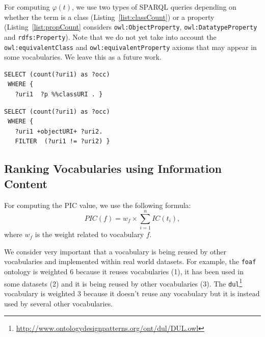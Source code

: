 For computing $\varphi(t)$, we use two types of SPARQL queries depending on whether the term is a class (Listing~\ref{list:classCount}) or a property (Listing~\ref{list:propCount} considers \texttt{owl:ObjectProperty}, \texttt{owl:Data\-typeProperty} and \texttt{rdfs:Property}). Note that we do not yet take into account the \texttt{owl:equivalentClass} and \texttt{owl:equi\-valentProperty} axioms that may appear in some vocabularies. We leave this as a future work.

\begin{lstlisting}[float=htb,caption={SPARQL query for computing the occurrence of a class },label=list:classCount]
 SELECT (count(?uri1) as ?occ)
 WHERE {
   ?uri1  ?p %%classURI . }
\end{lstlisting}

\begin{lstlisting}[float=htb,caption={SPARQL query for computing the occurrence of a property },label=list:propCount]
 SELECT (count(?uri1) as ?occ)
 WHERE {
   ?uri1 +objectURI+ ?uri2.
   FILTER  (?uri1 != ?uri2) }
\end{lstlisting}

\subsection{Ranking Vocabularies using Information Content}
For computing the PIC value, we use the following formula:
\begin{equation}
 PIC(f) =  w_{f} \times \sum_{i=1}^{n}IC(t_{i})  ,
\end{equation}
where $w_{f}$ is the weight related to vocabulary $f$.

We consider very important that a vocabulary is being reused by other vocabularies and implemented within real world datasets. For example, the \texttt{foaf} ontology is weighted $6$ because it reuses vocabularies (1), it has been used in some datasets (2) and it is being reused by other vocabularies (3). The \texttt{dul}\footnote{\url{http://www.ontologydesignpatterns.org/ont/dul/DUL.owl}} vocabulary is weighted $3$ because it doesn't reuse any vocabulary but it is instead used by several other vocabularies.



